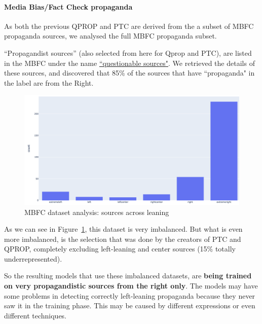 \paragraph{Media Bias/Fact Check propaganda}
As both the previous QPROP and PTC are derived from the a subset of MBFC propaganda sources, we analysed the full MBFC propaganda subset.

“Propagandist sources” (also selected from here for Qprop and PTC), are listed in the MBFC under the name \href{https://mediabiasfactcheck.com/fake-news/}{``questionable sources"}.
We retrieved the details of these sources, and discovered that 85\% of the sources that have ``propaganda" in the label are from the Right.

\begin{figure}[!htb]
   \centering
   \includegraphics[width=\linewidth]{figures/leaning_questionable.png}
   \caption{MBFC dataset analysis: sources across leaning}
   \label{fig:mbfc_across_leaning}
\end{figure}

As we can see in Figure~\ref{fig:mbfc_across_leaning}, this dataset is very imbalanced. But what is even more imbalanced, is the selection that was done by the creators of PTC and QPROP, completely excluding left-leaning and center sources (15\% totally underrepresented).

So the resulting models that use these imbalanced datasets, are \textbf{being trained on very propagandistic sources from the right only}. The models may have some problems in detecting correctly left-leaning propaganda because they never saw it in the training phase. This may be caused by different expressions or even different techniques. 

